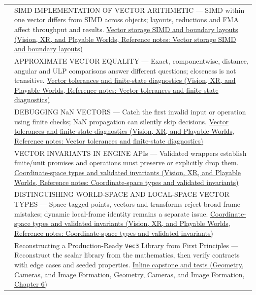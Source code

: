 {\begin{longtable}[]{@{}
  >{\raggedright\arraybackslash}p{}
  >{\raggedright\arraybackslash}p{}@{}}
595 & SIMD IMPLEMENTATION OF VECTOR ARITHMETIC --- SIMD within one vector differs from SIMD across objects; layouts, reductions and FMA affect throughput and results. \href{../07-Vision-XR-and-Playable-Worlds/main.pdf\#nameddest=appendix-26bf6bf2fb8b}{Vector storage SIMD and boundary layouts (Vision, XR, and Playable Worlds, Reference notes: Vector storage SIMD and boundary layouts)} \\
596 & APPROXIMATE VECTOR EQUALITY --- Exact, componentwise, distance, angular and ULP comparisons answer different questions; closeness is not transitive. \href{../07-Vision-XR-and-Playable-Worlds/main.pdf\#nameddest=appendix-b5b83329215b}{Vector tolerances and finite-state diagnostics (Vision, XR, and Playable Worlds, Reference notes: Vector tolerances and finite-state diagnostics)} \\
597 & DEBUGGING NaN VECTORS --- Catch the first invalid input or operation using finite checks; NaN propagation can silently skip decisions. \href{../07-Vision-XR-and-Playable-Worlds/main.pdf\#nameddest=appendix-b5b83329215b}{Vector tolerances and finite-state diagnostics (Vision, XR, and Playable Worlds, Reference notes: Vector tolerances and finite-state diagnostics)} \\
598 & VECTOR INVARIANTS IN ENGINE APIs --- Validated wrappers establish finite/unit promises and operations must preserve or explicitly drop them. \href{../07-Vision-XR-and-Playable-Worlds/main.pdf\#nameddest=appendix-380a220e2529}{Coordinate-space types and validated invariants (Vision, XR, and Playable Worlds, Reference notes: Coordinate-space types and validated invariants)} \\
599 & DISTINGUISHING WORLD-SPACE AND LOCAL-SPACE VECTOR TYPES --- Space-tagged points, vectors and transforms reject broad frame mistakes; dynamic local-frame identity remains a separate issue. \href{../07-Vision-XR-and-Playable-Worlds/main.pdf\#nameddest=appendix-380a220e2529}{Coordinate-space types and validated invariants (Vision, XR, and Playable Worlds, Reference notes: Coordinate-space types and validated invariants)} \\
600 & Reconstructing a Production-Ready \texttt{Vec3} Library from First Principles --- Reconstruct the scalar library from the mathematics, then verify contracts with edge cases and seeded properties. \href{../03-Geometry-Cameras-and-Image-Formation/main.pdf\#nameddest=02-foundations-ii-ch037-a-complete-scalar-laboratory-makes-the-story-executable}{Inline capstone and tests (Geometry, Cameras, and Image Formation, Geometry, Cameras, and Image Formation, Chapter 6)} \\
\end{longtable}
}


